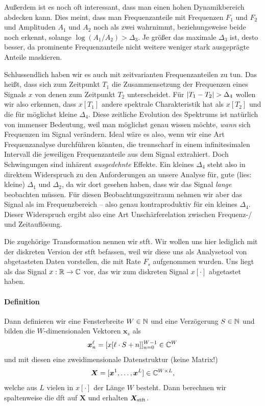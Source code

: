 Außerdem ist es noch oft interessant, dass man einen hohen Dynamikbereich abdecken kann.
Dies meint, dass man Frequenzanteile mit Frequenzen $F_1$ und $F_2$ und Amplituden $A_1$ und $A_2$ noch als zwei wahrnimmt, beziehungsweise beide noch erkennt, solange $\log(A_1/A_2) > \Delta_3$. 
Je größer das maximale $\Delta_3$ ist, desto besser, da prominente Frequenzanteile nicht weitere weniger stark ausgeprägte Anteile maskieren.

Schlussendlich haben wir es auch mit zeitvarianten Frequenzanteilen zu tun.
Das heißt, dass sich zum Zeitpunkt $T_1$ die Zusammensetzung der Frequenzen eines Signals $x$ von denen zum Zeitpunkt $T_2$ unterscheidet.
Für ${\left| T_1 - T_2 \right|} > \Delta_4$ wollen wir also erkennen, dass $x[T_1]$ andere spektrale Charakteristik hat als $x[T_2]$ und die für möglichst kleine $\Delta_4$.
Diese zeitliche Evolution des Spektrums ist natürlich von immenser Bedeutung, weil man möglichst genau wissen möchte, \emph{wann} sich Frequenzen im Signal verändern.
Ideal wäre es also, wenn wir eine Art  Frequenzanalyse durchführen könnten, die trennscharf in einem infinitesimalen Intervall die jeweiligen Frequenzanteile aus dem Signal extrahiert.
Doch Schwingungen sind inhärent \emph{ausgedehnte} Effekte.
Ein kleines $\Delta_4$ steht also in direktem Widerspruch zu den Anforderungen an unsere Analyse für, gute (lies: kleine) $\Delta_1$ und $\Delta_2$, da wir dort gesehen haben, dass wir das Signal \emph{lange} beobachten müssen.
Für diesen Beobachtungszeitraum nehmen wir aber das Signal als  im Frequenzbereich -- also genau kontraproduktiv für ein kleines $\Delta_4$.
Dieser Widerspruch ergibt also eine Art Unschärferelation zwischen Frequenz-/ und Zeitauflösung.

Die zugehörige Transformation nennen wir \gls{stft}.
Wir wollen uns hier lediglich mit der diskreten Version der \gls{stft} befassen, weil wir diese uns als Analysetool von abgetasteten Daten vorstellen, die mit Rate $F_s$ aufgenommen wurden.
Uns liegt als das Signal $x: \mathbb{R} \rightarrow \mathbb{C}$ vor, das wir zum diskreten Signal $x[\cdot]$ abgetastet haben.
%
\paragraph{Definition}
%
Dann definieren wir eine Fensterbreite $W \in \mathbb{N}$ und eine Verzögerung $S \in \mathbb{N}$ und bilden die $W$-dimensionalen Vektoren $\bm x_s$ als
\[
\bm x^\ell_n = [x[\ell \cdot S + n]]_{n = 0}^{W-1} \in \mathbb{C}^{W}
\]
und mit diesen eine zweidimensionale Datenstruktur (keine Matrix!)
\[
\bm X = [\bm x^1, \ldots, \bm x^L] \in \mathbb{C}^{W \times L},
\]
welche aus $L$ vielen  in $x[\cdot]$ der Länge $W$ besteht.
Dann berechnen wir spaltenweise die \gls{dft} auf $\bm X$ und erhalten $\bm X_{\rm stft}$.
%
